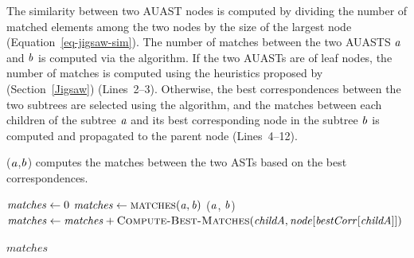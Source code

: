 


The similarity between two AUAST nodes is computed by dividing the number of matched elements among the two nodes by the size of the largest node (Equation~\ref{eq-jigsaw-sim}). The number of matches between the two AUASTS $\mathit{a}$ and $\mathit{b}$ is computed via the  algorithm. If the two AUASTs are of leaf nodes, the number of matches is computed using the heuristics proposed by \citet{2008:fse:cottrell} (Section~\ref{Jigsaw}) (Lines~2--3). Otherwise, the best correspondences between the two subtrees are selected using the  algorithm, and the matches between each children of the subtree $\mathit{a}$ and its best corresponding node in the subtree $\mathit{b}$ is computed and propagated to the parent node (Lines~4--12).


\begin{algorithm}
 \caption{($\mathit{a}$,$\mathit{b}$) computes the matches between the two ASTs based on the best correspondences.}
  \label{simi}
  \begin{algorithmic}[1]
  \ComputeBestMatches
  \State $\mathit{matches} \gets 0$
  \State $\mathit{matches} \gets   \textsc{matches}(\mathit{a},\mathit{b})$
    	\State {}($\mathit{a}$, $\mathit{b}$)
 		\State $\mathit{matches} \gets \mathit{matches}+\textsc{Compute-Best-Matches}(\mathit{childA},\mathit{node}[\mathit{bestCorr}[\mathit{childA}]])$		 
 \EndIf
 \EndFor

 \EndIf
 \Return $matches$
\end{algorithmic}
\end{algorithm}






